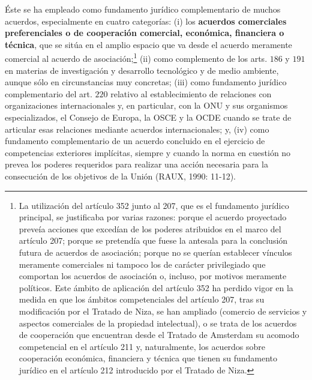\documentclass[10pt,a4paper]{article}
\begin{document}
Éste se ha empleado como fundamento jurídico complementario de muchos acuerdos, especialmente  en cuatro categorías: (i) los \textbf{acuerdos comerciales preferenciales o de cooperación comercial, económica, financiera o técnica}, que se sitúa en el amplio espacio que va desde el acuerdo meramente comercial al acuerdo de asociación;\footnote{%
    La utilización del artículo 352 junto al 207, que es el fundamento jurídico principal, se justificaba por varias razones: porque el acuerdo proyectado preveía acciones que excedían de los poderes atribuidos en el marco del artículo 207; porque se pretendía que fuese la antesala para la conclusión futura de acuerdos de asociación; porque no se querían establecer vínculos meramente comerciales ni tampoco los de carácter privilegiado que comportan los acuerdos de asociación o, incluso, por motivos meramente políticos. Este ámbito de aplicación del artículo 352 ha perdido vigor en la medida en que los ámbitos competenciales del artículo 207, tras su modificación por el Tratado de Niza, se han ampliado (comercio de servicios y aspectos comerciales de la propiedad intelectual), o se trata de los acuerdos de cooperación que encuentran desde el Tratado de Amsterdam su acomodo competencial en el artículo 211 y, naturalmente, los acuerdos sobre cooperación económica, financiera y técnica que tienen su fundamento jurídico en el artículo 212 introducido por el Tratado de Niza.
} (ii) como complemento de los arts. $186$ y $191$ en materias de investigación y desarrollo tecnológico y de medio ambiente, aunque sólo en circunstancias muy concretas; (iii) como fundamento jurídico complementario del art. $220$ relativo al establecimiento de relaciones con organizaciones internacionales y, en particular, con la ONU y sus organismos especializados, el Consejo de Europa, la OSCE y la OCDE cuando se trate de articular esas relaciones mediante acuerdos internacionales; y, (iv) como fundamento complementario de un acuerdo concluido en el ejercicio de competencias exteriores implícitas, siempre y cuando la norma en cuestión no prevea los poderes requeridos para realizar una acción necesaria para la consecución de los objetivos de la Unión (RAUX, 1990: 11-12).
\end{document}
